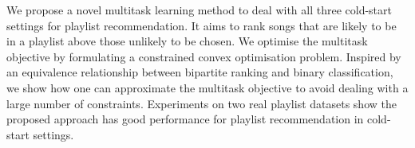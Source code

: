 We propose a novel multitask learning method to %
deal with all three cold-start settings for playlist recommendation.
It aims to rank songs that are likely to be in a playlist %
above those unlikely to be chosen.
%
We optimise the multitask objective by formulating %
a constrained convex optimisation problem.
Inspired by an equivalence relationship between bipartite ranking and binary classification,
we show how one can approximate the multitask objective to avoid dealing with a large number of constraints.
Experiments on two real playlist datasets show the proposed approach 
has good performance for playlist recommendation in cold-start settings.
%
